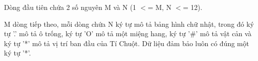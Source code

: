 Dòng đầu tiên chứa 2 số nguyên M và N (1 $<$= M, N $<$= 12).

M dòng tiếp theo, mỗi dòng chứa N ký tự mô tả bảng hình chữ nhật, trong đó ký tự '.' mô tả ô trống, ký tự 'O' mô tả một miệng hang, ký tự '\#' mô tả vật cản và ký tự '*' mô tả vị trí ban đầu của Tí Chuột. Dữ liệu đảm bảo luôn có đúng một ký tự '*'.